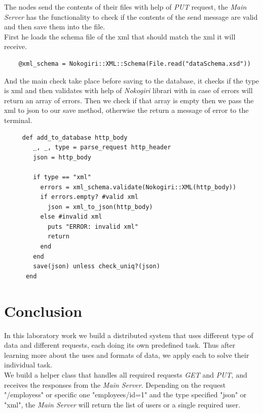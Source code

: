 \documentclass[12pt]{article}
\begin{document}
    The nodes send the contents of their files with help of \textit{PUT} request, the \textit{Main Server} has the 
    functionality to check if the contents of the send message are valid and then save them into the file. \\ 

    First he loads the schema file of the xml that should match the xml it will receive.  

    \begin{lstlisting}
    @xml_schema = Nokogiri::XML::Schema(File.read("dataSchema.xsd"))
    \end{lstlisting}

    And the main check take place before saving to the database, it checks if the type is xml and then 
    validates with help of \textit{Nokogiri} librari with in case of errors will return an array of errors. Then
    we check if that array is empty then we pass the xml to json to our save method, otherwise the return
    a message of error to the terminal.

    \begin{lstlisting} 
     def add_to_database http_body
        _, _, type = parse_request http_header
        json = http_body

        if type == "xml"
          errors = xml_schema.validate(Nokogiri::XML(http_body))
          if errors.empty? #valid xml
            json = xml_to_json(http_body)
          else #invalid xml
            puts "ERROR: invalid xml"
            return
          end
        end
        save(json) unless check_uniq?(json)
      end
    \end{lstlisting}


    \section{Conclusion}

    In this laboratory work we build a distributed system that uses different type of data and different requests, each doing its own predefined task.
    Thus after learning more about the uses and formats of data, we apply each to solve their individual task. \\

    We build a helper class that handles all required requests \textit{GET} and \textit{PUT}, and receives the responses from the \textit{Main Server}.
    Depending on the request "/employess" or specific one "employees/id=1" and the type specified "json" or "xml", the \textit{Main Server} will 
    return the list of users or a single required user.
\end{document}
